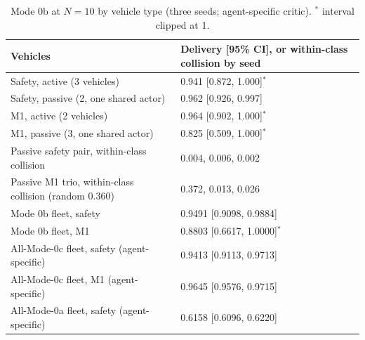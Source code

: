 \begin{table}[t]
\centering
\caption{Mode 0b at $N = 10$ by vehicle type (three seeds; agent-specific critic). $^{*}$ interval clipped at 1.}
\label{tab:mode0b}
\footnotesize
\begin{tabular}{ll}
\toprule
Vehicles & Delivery [95\% CI], or within-class collision by seed \\
\midrule
Safety, active (3 vehicles) & 0.941 [0.872, 1.000]$^{*}$ \\
Safety, passive (2, one shared actor) & 0.962 [0.926, 0.997] \\
M1, active (2 vehicles) & 0.964 [0.902, 1.000]$^{*}$ \\
M1, passive (3, one shared actor) & 0.825 [0.509, 1.000]$^{*}$ \\
\midrule
Passive safety pair, within-class collision & 0.004, 0.006, 0.002 \\
Passive M1 trio, within-class collision (random 0.360) & 0.372, 0.013, 0.026 \\
\midrule
Mode 0b fleet, safety & 0.9491 [0.9098, 0.9884] \\
Mode 0b fleet, M1 & 0.8803 [0.6617, 1.0000]$^{*}$ \\
All-Mode-0c fleet, safety (agent-specific) & 0.9413 [0.9113, 0.9713] \\
All-Mode-0c fleet, M1 (agent-specific) & 0.9645 [0.9576, 0.9715] \\
All-Mode-0a fleet, safety (agent-specific) & 0.6158 [0.6096, 0.6220] \\
\bottomrule
\end{tabular}
\end{table}

